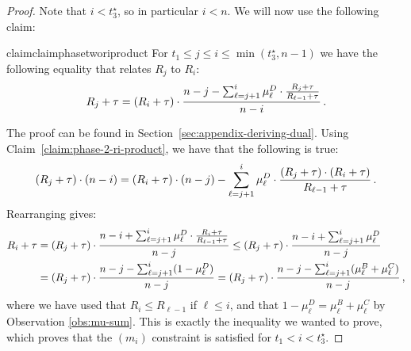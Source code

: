 \begin{proof}
    Note that $i < t_3^\star$, so in particular $i < n$.
    We will now use the following claim:
    \begin{restatable}{claim}{claimphasetworiproduct}\label{claim:phase-2-ri-product}
        For $t_1\leq j\leq i \leq \min(t_3^\star, n - 1)$ we have the following equality that relates $R_j$ to $R_i$:
        \begin{equation*}
            R_j+\tau = (R_i + \tau) \cdot \frac{n-j - \sum_{\ell=j+1}^i \mu_\ell^D \cdot \frac{R_j+\tau}{R_{\ell-1}+\tau}}{n-i}\,.
        \end{equation*}
    \end{restatable}
    The proof can be found in Section~\ref{sec:appendix-deriving-dual}.
    Using Claim~\ref{claim:phase-2-ri-product}, we have that the following is true:
    \begin{equation*}
        (R_j + \tau)\cdot(n-i) = (R_i+\tau) \cdot (n-j) - \sum_{\ell=j+1}^i \mu_\ell^D \cdot \frac{(R_j+\tau)\cdot (R_i+\tau)}{R_{\ell-1}+\tau}\,.
    \end{equation*}
    Rearranging gives:
    \begin{align*}
        R_i+\tau 
        &= (R_j + \tau)\cdot\frac{n-i+\sum_{\ell=j+1}^i \mu_\ell^D \cdot \frac{R_i+\tau}{R_{\ell-1}+\tau}}{n-j} 
        \leq (R_j + \tau)\cdot\frac{n-i+\sum_{\ell=j+1}^i \mu_\ell^D}{n-j}\\
        &= (R_j + \tau)\cdot\frac{n-j-\sum_{\ell=j+1}^i (1-\mu_\ell^D)}{n-j} 
        = (R_j + \tau)\cdot\frac{n-j-\sum_{\ell=j+1}^i (\mu_\ell^B+\mu_\ell^C)}{n-j}\,,
    \end{align*}
    where we have used that $R_i\leq R_{\ell-1}$ if $\ell\leq i$, and that $1-\mu_\ell^D = \mu_\ell^B + \mu_\ell^C$ by Observation \ref{obs:mu-sum}. This is exactly the inequality we wanted to prove,
    which proves that the $(m_i)$ constraint is satisfied for $t_1 < i < t_3^\star$.
    

\end{proof}
